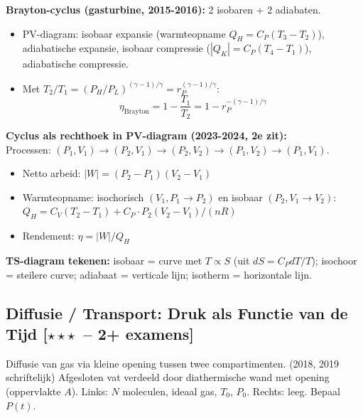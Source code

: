\documentclass[10pt,a4paper]{article}
\begin{document}
\begin{oplossing}
\textbf{Brayton-cyclus (gasturbine, 2015-2016):} 2 isobaren + 2 adiabaten.
\begin{itemize}
  \item PV-diagram: isobaar expansie (warmteopname $Q_H = C_P(T_3-T_2)$), adiabatische expansie, isobaar compressie ($|Q_K| = C_P(T_4-T_1)$), adiabatische compressie.
  \item Met $T_2/T_1 = (P_H/P_L)^{(\gamma-1)/\gamma} = r_P^{(\gamma-1)/\gamma}$:
  $$\eta_\text{Brayton} = 1 - \frac{T_1}{T_2} = 1 - r_P^{-(\gamma-1)/\gamma}$$
\end{itemize}

\textbf{Cyclus als rechthoek in PV-diagram (2023-2024, 2e zit):}\\
Processen: $(P_1,V_1) \to (P_2,V_1) \to (P_2,V_2) \to (P_1,V_2) \to (P_1,V_1)$.
\begin{itemize}
  \item Netto arbeid: $|W| = (P_2-P_1)(V_2-V_1)$
  \item Warmteopname: isochorisch $(V_1,P_1\to P_2)$ en isobaar $(P_2, V_1\to V_2)$: $Q_H = C_V(T_2-T_1) + C_P\cdot P_2(V_2-V_1)/(nR)$
  \item Rendement: $\eta = |W|/Q_H$
\end{itemize}

\textbf{TS-diagram tekenen:} isobaar = curve met $T\propto S$ (uit $dS=C_P dT/T$); isochoor = steilere curve; adiabaat = verticale lijn; isotherm = horizontale lijn.
\end{oplossing}

\subsection{Diffusie / Transport: Druk als Functie van de Tijd \textnormal{\color{warningred}[$\star\star\star$\ -- 2+ examens]}}

\begin{oefening}{Diffusie van gas via kleine opening tussen twee compartimenten. \textnormal{(2018, 2019 schriftelijk)}}
Afgesloten vat verdeeld door diathermische wand met opening (oppervlakte $A$). Links: $N$ moleculen, ideaal gas, $T_0$, $P_0$. Rechts: leeg. Bepaal $P(t)$.
\end{oefening}
\end{document}
